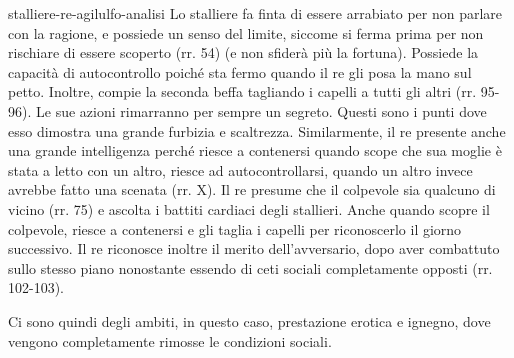 \documentclass[preview]{standalone}
\begin{document}
\begin{snippet}{stalliere-re-agilulfo-analisi}
    Lo stalliere fa finta di essere arrabiato per non parlare con la ragione, e
    possiede un senso del limite, siccome si ferma prima per non rischiare di essere scoperto (rr. 54) (e non sfiderà più la fortuna).
    Possiede la capacità di autocontrollo poiché sta fermo quando il re gli posa la mano
    sul petto. Inoltre, compie la seconda beffa tagliando i capelli a tutti gli altri (rr. 95-96).
    Le sue azioni rimarranno per sempre un segreto.
    Questi sono i punti dove esso dimostra una grande furbizia e scaltrezza.
    Similarmente, il re presente anche una grande intelligenza
    perché riesce a contenersi quando scope che sua moglie è stata a letto con un altro,
    riesce ad autocontrollarsi, quando un altro invece avrebbe fatto una scenata (rr. X).
    Il re presume che il colpevole sia qualcuno di vicino (rr. 75) e ascolta i battiti
    cardiaci degli stallieri. Anche quando scopre il colpevole, riesce a contenersi e gli taglia
    i capelli per riconoscerlo il giorno successivo.
    Il re riconosce inoltre il merito dell'avversario, dopo aver combattuto sullo stesso
    piano nonostante essendo di ceti sociali completamente opposti (rr. 102-103).
    
    Ci sono quindi degli ambiti, in questo caso, prestazione erotica e ignegno,
    dove vengono completamente rimosse le condizioni sociali.
\end{snippet}
\end{document}
